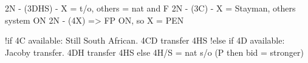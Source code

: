 2N - (3DHS) - X = t/o, others = nat and F
2N - (3C) - X = Stayman, others system ON
2N - (4X) => FP ON, so X = PEN

!if 4C available: Still South African. 4CD transfer 4HS
!else if 4D available: Jacoby transfer. 4DH transfer 4HS
else 4H/S = nat s/o (P then bid = stronger)